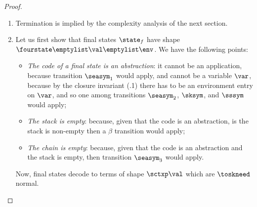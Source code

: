 \begin{proof}
\begin{enumerate}
\begin{enumerate}
\item If $\state = \fourstate \chain \var \stack {\env\cons\esub\var\tm\cons\envtwo}
	  	\tomachseatwo 
	  	\fourstate {\chain\cons(\var, \stack, \env\esub\var\cdot)} \tm \stempty \envtwo  = \statetwo$ then:
\[\begin{array}{lllllllll}
 \decode{\fourstate \chain \var \stack {\env\cons\esub\var\tm\cons\envtwo}}
 & = &
 \decodep{\env\cons\esub\var\tm\cons\envtwo}{\decodep\chain{\decodep\stack{\var}}}
\\ & = &
 \decodep{\envtwo}{\decodep\env{\decodep\chain{\decodep\stack\var}}\esub\var\tm}
 & = &		
	\decode{\fourstate {\chain\cons(\var, \stack, \env\esub\var\cdot)} \tm \stempty \envtwo}.
\end{array}\]

\item If $\state = \fourstate {\chain\cons(\var, \stack, \env\esub\var\cdot)} \val \stempty \envtwo
		 \tomachseathree 
		\fourstate \chain \var \stack {\env\cons\esub\var{\val}\cons\envtwo} = \statetwo$ then:
\[\begin{array}{lllllllll}
 \decode{\fourstate {\chain\cons(\var, \stack, \env\esub\var\cdot)} \val \stempty \envtwo}
 & = &
 \decodep{\envtwo}{\decodep\env{\decodep\chain{\decodep\stack\var}}\esub\var\val}
\\ & = &
\decodep{\env\cons\esub\var\val\cons\envtwo}{\decodep\chain{\decodep\stack{\var}}}
 & = &		
	\decode{\fourstate \chain \var \stack {\env\cons\esub\var\val\cons\envtwo}}.
\end{array}\]
\end{enumerate}

\item Termination is implied by the complexity analysis of the next section.
\item Let us first show that final states $\state_f$ have shape $\fourstate\emptylist\val\emptylist\env$. We have the following points:
\begin{itemize}
\item \emph{The code of a final state is an abstraction}: it cannot be an application, because transition $\seasym_1$ would apply, and cannot be a variable $\var$, because by the closure invariant (.1) there has to be an environment entry on $\var$, and so one among transitions $\seasym_2$, $\sksym$, and $\sssym$ would apply;
\item \emph{The stack is empty}: because, given that the code is an abstraction, is the stack is non-empty then a $\beta$ transition would apply;
\item \emph{The chain is empty}: because, given that the code is an abstraction and the stack is empty, then transition $\seasym_3$ would apply.
\end{itemize}
Now, final states decode to terms of shape $\sctxp\val$ which are $\toskneed$ normal.
\qedhere
\end{enumerate}
\end{proof}

